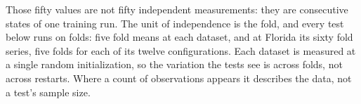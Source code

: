Those fifty values are not fifty independent measurements: they are consecutive states of one
training run.
The unit of independence is the fold, and every test below runs on folds: five fold means at each
dataset, and at Florida its sixty fold series, five folds for each of its twelve configurations.
Each dataset is measured at a single random initialization, so the variation the tests see is
across folds, not across restarts. Where a count of observations appears it describes the data, not
a test's sample size.

